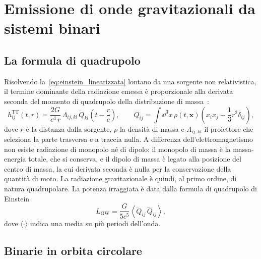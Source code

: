 \section{Emissione di onde gravitazionali da sistemi binari} \label{sec:GW_binarie}

\subsection{La formula di quadrupolo}

Risolvendo la~\eqref{eq:einstein_linearizzata} lontano da una sorgente non relativistica, il termine dominante della radiazione emessa è proporzionale alla derivata seconda del momento di quadrupolo della distribuzione di massa~\cite{Maggiore2008}:
\begin{equation}
    h_{ij}^{\mathrm{TT}}(t, r) = \frac{2G}{c^4\, r}\, \Lambda_{ij,kl}\, \ddot{Q}_{kl}\!\left(t - \frac{r}{c}\right) ,
    \qquad
    Q_{ij} = \int \dd^3x\, \rho(t,\bm{x}) \left( x_i x_j - \frac{1}{3}r^2 \delta_{ij} \right) ,
    \label{eq:quadrupolo}
\end{equation}
dove $r$ è la distanza dalla sorgente, $\rho$ la densità di massa e $\Lambda_{ij,kl}$ il proiettore che seleziona la parte trasversa e a traccia nulla. A differenza dell'elettromagnetismo non esiste radiazione di monopolo né di dipolo: il monopolo di massa è la massa-energia totale, che si conserva, e il dipolo di massa è legato alla posizione del centro di massa, la cui derivata seconda è nulla per la conservazione della quantità di moto. La radiazione gravitazionale è quindi, al primo ordine, di natura quadrupolare. La potenza irraggiata è data dalla formula di quadrupolo di Einstein
\begin{equation}
    L_{\mathrm{GW}} = \frac{G}{5c^5} \left\langle \dddot{Q}_{ij}\, \dddot{Q}_{ij} \right\rangle ,
    \label{eq:luminosita_quadrupolo}
\end{equation}
dove $\langle\cdot\rangle$ indica una media su più periodi dell'onda.

\subsection{Binarie in orbita circolare}


